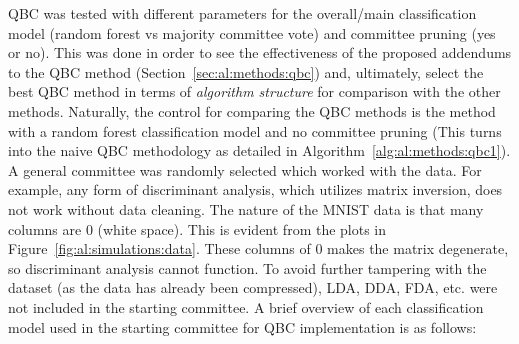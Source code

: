 \noindent QBC was tested with different parameters for the overall/main 
classification model (random forest vs majority committee vote) and committee 
pruning (yes or no). This was done in order to see the effectiveness of the 
proposed addendums to the QBC method (Section~\ref{sec:al:methods:qbc}) and, 
ultimately, select the best QBC method in terms of \textit{algorithm structure} 
for comparison with the other methods. Naturally, the control for comparing the 
QBC methods is the method with a random forest classification model and no 
committee pruning (This turns into the naive QBC methodology as detailed in 
Algorithm~\ref{alg:al:methods:qbc1}). A general committee was randomly selected 
which worked with the data. For example, any form of discriminant analysis, 
which utilizes matrix inversion, does not work without data cleaning. The 
nature of the MNIST data is that many columns are 0 (white space). This is 
evident from the plots in Figure~\ref{fig:al:simulations:data}. These columns 
of 0 makes the matrix degenerate, so discriminant analysis cannot function. 
To avoid further tampering with the dataset (as the data has already been 
compressed), LDA, DDA, FDA, etc. were not included in the starting committee. 
A brief overview of each classification model used in the starting committee 
for QBC implementation is as follows:


